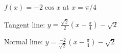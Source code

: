 {$f(x)=-2\cos x$ at $x=\pi/4$
}
{Tangent line: $y = \frac{\sqrt{2}}{2}(x-\frac{\pi}{4})-\sqrt{2}$

Normal line: $y = \frac{-2}{\sqrt{2}}(x-\frac{\pi}{4})-\sqrt{2}$
}
